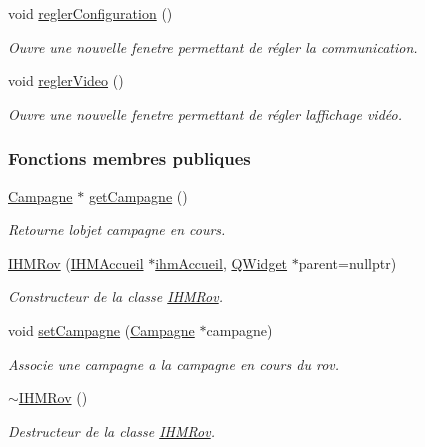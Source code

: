 \begin{DoxyCompactItemize}
void \hyperlink{class_i_h_m_rov_a9b517b4891917634d64c903894bcc48b}{regler\+Configuration} ()
\begin{DoxyCompactList}\small\item\em Ouvre une nouvelle fenetre permettant de régler la communication. \end{DoxyCompactList}\item 
void \hyperlink{class_i_h_m_rov_a68653dfe09dbb9695797d60e9190366b}{regler\+Video} ()
\begin{DoxyCompactList}\small\item\em Ouvre une nouvelle fenetre permettant de régler l\textquotesingle{}affichage vidéo. \end{DoxyCompactList}\end{DoxyCompactItemize}
\subsubsection*{Fonctions membres publiques}
\begin{DoxyCompactItemize}
\item 
\hyperlink{class_campagne}{Campagne} $\ast$ \hyperlink{class_i_h_m_rov_ab3e8686eef9233b4c1e6711cf1c4576a}{get\+Campagne} ()
\begin{DoxyCompactList}\small\item\em Retourne l\textquotesingle{}objet campagne en cours. \end{DoxyCompactList}\item 
\hyperlink{class_i_h_m_rov_a403274da2bd4ca316f2f1b64a48a315b}{I\+H\+M\+Rov} (\hyperlink{class_i_h_m_accueil}{I\+H\+M\+Accueil} $\ast$\hyperlink{class_i_h_m_rov_aa22f6fe8daf5c67071ec02a348e5cc3e}{ihm\+Accueil}, \hyperlink{class_q_widget}{Q\+Widget} $\ast$parent=nullptr)
\begin{DoxyCompactList}\small\item\em Constructeur de la classe \hyperlink{class_i_h_m_rov}{I\+H\+M\+Rov}. \end{DoxyCompactList}\item 
void \hyperlink{class_i_h_m_rov_a301a0b8cb323c2c9de71df9070bb7555}{set\+Campagne} (\hyperlink{class_campagne}{Campagne} $\ast$campagne)
\begin{DoxyCompactList}\small\item\em Associe une campagne a la campagne en cours du rov. \end{DoxyCompactList}\item 
\hyperlink{class_i_h_m_rov_ab861463889934a3b6083b7a29c6adf45}{$\sim$\+I\+H\+M\+Rov} ()
\begin{DoxyCompactList}\small\item\em Destructeur de la classe \hyperlink{class_i_h_m_rov}{I\+H\+M\+Rov}. \end{DoxyCompactList}\end{DoxyCompactItemize}
